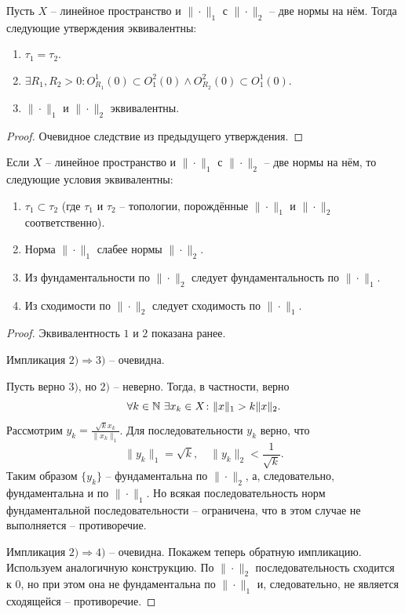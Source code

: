 \begin{corollary}
    Пусть $X$ -- линейное пространство и $\|\cdot\|_1$ с $\|\cdot\|_2$ -- две нормы на нём.
    Тогда следующие утверждения эквивалентны:
    \begin{enumerate}
        \item $\tau_1 = \tau_2$.
        \item $\exists R_1, R_2 > 0\colon O_{R_1}^1(0) \subset O_1^2(0) \wedge O_{R_2}^2(0) \subset O_1^1(0)$.
        \item $\|\cdot\|_1$ и $\|\cdot\|_2$ эквивалентны.
    \end{enumerate}
\end{corollary}
\begin{proof}
    Очевидное следствие из предыдущего утверждения.
\end{proof}
\begin{proposition}
    Если $X$ -- линейное пространство и $\|\cdot\|_1$ с $\|\cdot\|_2$ -- две нормы на нём, то следующие условия эквивалентны:
    \begin{enumerate}
        \item $\tau_1 \subset \tau_2$ (где $\tau_1$ и $\tau_2$ -- топологии, порождённые $\|\cdot\|_1$ и $\|\cdot\|_2$ соответственно).
        \item Норма $\|\cdot\|_1$ слабее нормы $\|\cdot\|_2$.
        \item Из фундаментальности по $\|\cdot\|_2$ следует фундаментальность по $\|\cdot\|_1$.
        \item Из сходимости по $\|\cdot\|_2$ следует сходимость по $\|\cdot\|_1$.
    \end{enumerate}
\end{proposition}
\begin{proof}
    Эквивалентность $1$ и $2$ показана ранее.

    Импликация $2) \Rightarrow 3)$ -- очевидна.

    Пусть верно $3)$, но $2)$ -- неверно.
    Тогда, в частности, верно
    \[
        \forall k \in \mathbb{N} \ \exists x_k \in X\colon \|x\|_1 > k\|x\|_2.
    \]
    Рассмотрим $y_k = \frac{\sqrt{k} x_k}{\|x_k\|_1}$.
    Для последовательности $y_k$ верно, что
    \[
        \|y_k\|_1 = \sqrt{k}, \quad \|y_k\|_2 < \frac{1}{\sqrt{k}}.
    \]
    Таким образом $\{y_k\}$ -- фундаментальна по $\|\cdot\|_2$, а, следовательно, фундаментальна и по $\|\cdot\|_1$.
    Но всякая последовательность норм фундаментальной последовательности -- ограничена, что в этом случае не выполняется -- противоречие.

    Импликация $2) \Rightarrow 4)$ -- очевидна.
    Покажем теперь обратную импликацию.
    Используем аналогичную конструкцию.
    По $\|\cdot\|_2$ последовательность сходится к $0$, но при этом она не фундаментальна по $\|\cdot\|_1$ и, следовательно, не является сходящейся -- противоречие.
\end{proof}
